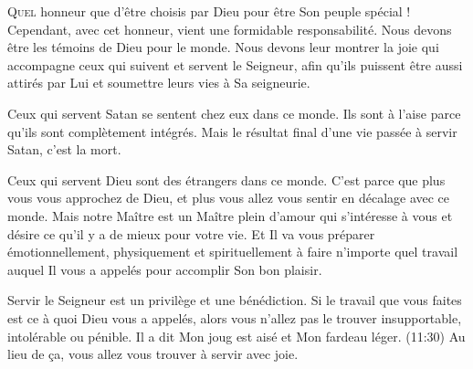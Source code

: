 


\lettrine{Q}{uel} honneur que d'être choisis par Dieu
 pour être Son peuple spécial !
 Cependant, avec cet honneur, vient une formidable responsabilité.
 Nous devons être les témoins de Dieu pour le monde.
 Nous devons leur montrer la joie qui accompagne ceux qui suivent
 et servent le Seigneur, afin qu'ils puissent être aussi attirés par Lui
 et soumettre leurs vies à Sa seigneurie. 


Ceux qui servent Satan se sentent chez eux dans ce monde.
 Ils sont à l'aise parce qu'ils sont complètement intégrés.
 Mais le résultat final d'une vie passée à servir Satan, c'est la mort.

Ceux qui servent Dieu sont des étrangers dans ce monde.
 C'est parce que plus vous vous approchez de Dieu,
 et plus vous allez vous sentir en décalage avec ce monde.
 Mais notre Maître est un Maître plein d'amour qui s'intéresse à vous
 et désire ce qu'il y a de mieux pour votre vie.
 Et Il va vous préparer émotionnellement, physiquement et spirituellement
 à faire n'importe quel travail auquel Il vous a appelés
 pour accomplir Son bon plaisir.

Servir le Seigneur est un privilège et une bénédiction.
 Si le travail que vous faites est ce à quoi Dieu vous a appelés,
 alors vous n'allez pas le trouver insupportable, intolérable ou pénible.
 Il a dit\frcolon{} \Og Mon joug est aisé et Mon fardeau léger. \Fg{}
 (11:30)
 Au lieu de \c{c}a, vous allez vous trouver à servir avec joie. 

\dvrule




